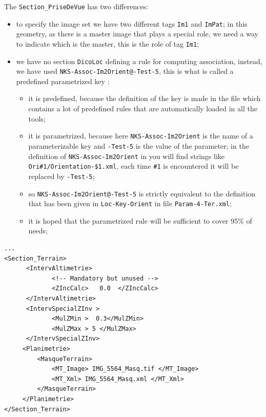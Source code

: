 \label{SECASSOC:PRED}
The {\tt Section\_PriseDeVue} has two differences:

\begin{itemize}
   \item  to specify the image set we have two different tags {\tt Im1} and {\tt ImPat};
          in this geometry, as there is a master image that plays a special role, we need
          a way to indicate which is the master, this is the role of tag {\tt Im1};

   \item  we have no section {\tt DicoLoc} defining a rule for computing association,
          instead, we have used {\tt NKS-Assoc-Im2Orient@-Test-5}, this is what is
          called a predefined parametrized key :

\begin{itemize}
    \item  it is predefined, because the definition of the key is made in the file
            which contains a lot
           of predefined rules that are automatically loaded in all the tools;

    \item  it is parametrized, because here {\tt NKS-Assoc-Im2Orient} is the name of
           a parameterizable key and {\tt -Test-5} is the value of the parameter;
           in the definition of {\tt NKS-Assoc-Im2Orient} in 
           you will find strings like {\tt Ori\#1/Orientation-\$1.xml}, each time {\tt \#1} is
           encountered it will be replaced by {\tt -Test-5};

     \item so {\tt NKS-Assoc-Im2Orient@-Test-5} is strictly equivalent to the definition that has been
           given in {\tt Loc-Key-Orient} in file {\tt Param-4-Ter.xml};

     \item it is hoped that the parametrized rule will be sufficient to cover $95\%$ of needs;
\end{itemize}
\end{itemize}


{\scriptsize
\begin{verbatim}
...
<Section_Terrain>
      <IntervAltimetrie>
             <!-- Mandatory but unused -->
             <ZIncCalc>   0.0  </ZIncCalc>
      </IntervAltimetrie>
      <IntervSpecialZInv >
             <MulZMin >  0.3</MulZMin>
             <MulZMax > 5 </MulZMax>
      </IntervSpecialZInv>
     <Planimetrie>
         <MasqueTerrain>
             <MT_Image> IMG_5564_Masq.tif </MT_Image>
             <MT_Xml> IMG_5564_Masq.xml </MT_Xml>
         </MasqueTerrain>
     </Planimetrie>
</Section_Terrain>
\end{verbatim}
}

